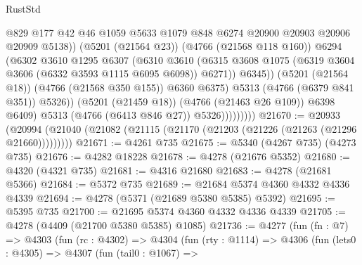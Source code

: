 \begin{lexlean}{RustStd}
\begin{coremodule}
{\begin{coremodule}
{{{{{{{{{{{{{{{{{{{{{{{{{{{{{{{{{{{                                    @829
                                    @177
                                    @42
                                    @46
                                    @1059
                                    @5633
                                    @1079
                                    @848
                                    @6274
                                    @20900
                                    @20903
                                    @20906
                                    @20909
                                    @5138))
                                (@5201 (@21564 @23))
                                (@4766 (@21568 @118 @160))
                                @6294
                                (@6302
                                  @3610
                                  @1295
                                  @6307
                                  (@6310
                                    @3610
                                    (@6315
                                      @3608
                                      @1075
                                      (@6319 @3604 @3606 (@6332 @3593 @1115 @6095 @6098))
                                      @6271))
                                  @6345))
                              (@5201 (@21564 @18))
                              (@4766 (@21568 @350 @155))
                              @6360
                              @6375)
                            @5313
                            (@4766 (@6379 @841 @351))
                            @5326))
                        (@5201 (@21459 @18))
                        (@4766 (@21463 @26 @109))
                        @6398
                        @6409)
                      @5313
                      (@4766 (@6413 @846 @27))
                      @5326)))))))))
@21670 := @20933
    (@20994 (@21040 (@21082 (@21115 (@21170 (@21203 (@21226 (@21263 (@21296 @21660)))))))))
@21671 := @4261 @735
@21675 := @5340 (@4267 @735) (@4273 @735)
@21676 := @4282 @18228
@21678 := @4278 (@21676 @5352)
@21680 := @4320 (@4321 @735)
@21681 := @4316 @21680
@21683 := @4278 (@21681 @5366)
@21684 := @5372 @735
@21689 := @21684 @5374 @4360 @4332 @4336 @4339
@21694 := @4278 (@5371 (@21689 @5380 @5385) @5392)
@21695 := @5395 @735
@21700 := @21695 @5374 @4360 @4332 @4336 @4339
@21705 := @4278 (@4409 (@21700 @5380 @5385) @1085)
@21736 := @4277
    (fun (fn : @7) =>
    @4303
      (fun (rc : @4302) =>
      @4304
        (fun (rty : @1114) =>
        @4306
          (fun (lets0 : @4305) =>
          @4307
            (fun (tail0 : @1067) =>
}}}}}}}}}}}}}}}}}}}}}}}}}}}}}}}}}}}
\end{coremodule}}
\end{coremodule}
\end{lexlean}
